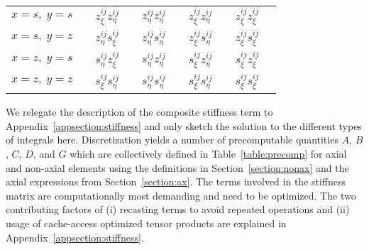 \begin{table*}
\begin{minipage}{156mm}
\begin{center}
\begin{tabular}{@{}llllll}
$x=s,\; y=s$ &$\hspace{1em} z_\xi^{ij} z_\eta^{ij} $
&$\hspace{1em} z_\eta^{ij} z_\eta^{ij}$ &$\hspace{1em} z_\xi^{ij} 
z_\eta^{ij}$ &$\hspace{1em} z_\xi^{ij} z_\xi^{ij}$ \\[5pt]
$x=s,\; y=z$ &$\hspace{1em} z_\eta^{ij} s_\xi^{ij} $
&$\hspace{1em} z_\eta^{ij} s_\eta^{ij}$ &$\hspace{1em} z_\xi^{ij} 
s_\eta^{ij}$ &$\hspace{1em} z_\xi^{ij} s_\xi^{ij}$ \\[5pt]
$x=z,\; y=s$ &$\hspace{1em} s_\eta^{ij} z_\xi^{ij}$
&$\hspace{1em} s_\eta^{ij} z_\eta^{ij}$ &$\hspace{1em} s_\xi^{ij} 
z_\eta^{ij}$ &$\hspace{1em} s_\xi^{ij} z_\xi^{ij}$ \\[5pt]
$x=z,\; y=z$ &$\hspace{1em} s_\xi^{ij} s_\eta^{ij}$ &$\hspace{1em}
s_\eta^{ij} s_\eta^{ij} $&$\hspace{1em} s_\xi^{ij} 
s_\eta^{ij}$ &$\hspace{1em} s_\xi^{ij} s_\xi^{ij}$ \\[5pt] 
\hline 
\end{tabular}
\end{center}
\end{minipage}
\end{table*}
%
We relegate the description of the composite stiffness term to 
Appendix~\ref{appsection:stiffness} and only sketch the solution to the 
different types of integrals here.
Discretization yields a number of precomputable quantities 
$A$, $B$, $C$, $D$, and $G$ which are collectively defined 
in Table~\ref{table:precomp} for axial and non-axial elements using the 
definitions in Section~\ref{section:nonax} and the axial expressions from 
Section~\ref{section:ax}.
The terms involved in the stiffness matrix are computationally 
most demanding and need to be optimized. The two contributing factors of (i) 
recasting terms to avoid repeated operations and 
(ii) usage of cache-access optimized tensor products are 
explained in Appendix~\ref{appsection:stiffness}.


